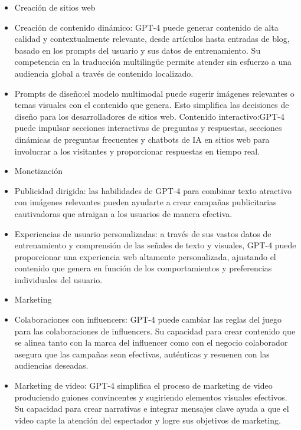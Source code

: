 \documentclass[a4paper12pt]{article}
\begin{document}
\begin{itemize}
\item
  Creación de sitios web
\item
  Creación de contenido dinámico: GPT-4 puede generar contenido de alta
  calidad y contextualmente relevante, desde artículos hasta entradas de
  blog, basado en los prompts del usuario y sus datos de entrenamiento.
  Su competencia en la traducción multilingüe permite atender sin
  esfuerzo a una audiencia global a través de contenido localizado.
\item
  Prompts de diseño:el modelo multimodal puede sugerir imágenes
  relevantes o temas visuales con el contenido que genera. Esto
  simplifica las decisiones de diseño para los desarrolladores de sitios
  web. Contenido interactivo:GPT-4 puede impulsar secciones interactivas
  de preguntas y respuestas, secciones dinámicas de preguntas frecuentes
  y chatbots de IA en sitios web para involucrar a los visitantes y
  proporcionar respuestas en tiempo real.
\item
  Monetización
\item
  Publicidad dirigida: las habilidades de GPT-4 para combinar texto
  atractivo con imágenes relevantes pueden ayudarte a crear campañas
  publicitarias cautivadoras que atraigan a los usuarios de manera
  efectiva.
\item
  Experiencias de usuario personalizadas: a través de sus vastos datos
  de entrenamiento y comprensión de las señales de texto y visuales,
  GPT-4 puede proporcionar una experiencia web altamente personalizada,
  ajustando el contenido que genera en función de los comportamientos y
  preferencias individuales del usuario.
\item
  Marketing
\item
  Colaboraciones con influencers: GPT-4 puede cambiar las reglas del
  juego para las colaboraciones de influencers. Su capacidad para crear
  contenido que se alinea tanto con la marca del influencer como con el
  negocio colaborador asegura que las campañas sean efectivas,
  auténticas y resuenen con las audiencias deseadas.
\item
  Marketing de video: GPT-4 simplifica el proceso de marketing de video
  produciendo guiones convincentes y sugiriendo elementos visuales
  efectivos. Su capacidad para crear narrativas e integrar mensajes
  clave ayuda a que el video capte la atención del espectador y logre
  sus objetivos de marketing.
\end{itemize}
\end{document}
